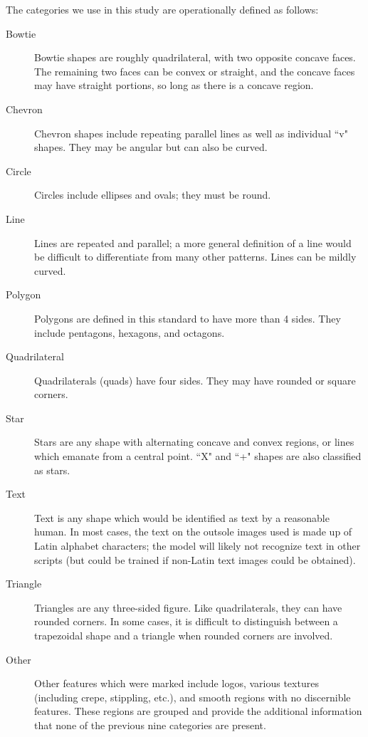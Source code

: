 \documentclass{article}\usepackage[]{graphicx}\usepackage[table]{xcolor}
\begin{document}
The categories we use in this study are operationally defined as follows:
\begin{description}
\item [Bowtie] Bowtie shapes are roughly quadrilateral, with two opposite concave faces. The remaining two faces can be convex or straight, and the concave faces may have straight portions, so long as there is a concave region.
\item [Chevron] Chevron shapes include repeating parallel lines as well as individual ``v" shapes. They may be angular but can also be curved.
\item [Circle] Circles include ellipses and ovals; they must be round.
\item [Line] Lines are repeated and parallel; a more general definition of a line would be difficult to differentiate from many other patterns. Lines can be mildly curved.
\item [Polygon] Polygons are defined in this standard to have more than 4 sides. They include pentagons, hexagons, and octagons.
\item [Quadrilateral] Quadrilaterals (quads) have four sides. They may have rounded or square corners.
\item [Star] Stars are any shape with alternating concave and convex regions, or lines which emanate from a central point. ``X" and ``+" shapes are also classified as stars.
\item [Text] Text is any shape which would be identified as text by a reasonable human. In most cases, the text on the outsole images used is made up of Latin alphabet characters; the model will likely not recognize text in other scripts (but could be trained if non-Latin text images could be obtained).
\item [Triangle] Triangles are any three-sided figure. Like quadrilaterals, they can have rounded corners. In some cases, it is difficult to distinguish between a trapezoidal shape and a triangle when rounded corners are involved.
\item [Other] Other features which were marked include logos, various textures (including crepe, stippling, etc.), and smooth regions with no discernible features. These regions are grouped and provide the additional information that none of the previous nine categories are present.
\end{description}
\end{document}
